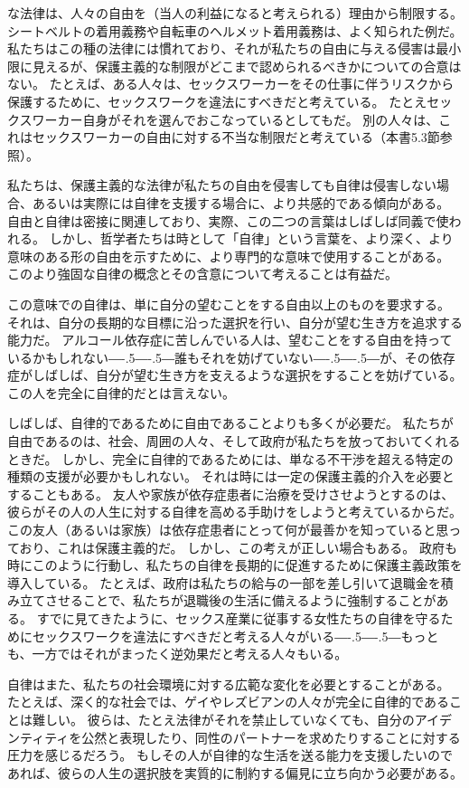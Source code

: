 \documentclass[paper=a4,book,openany]{jlreq}
\def\DDASH{―\kern-.5\zw―\kern-.5\zw―}
\begin{document}
な法律は、人々の自由を（当人の利益になると考えられる）理由から制限する。
シートベルトの着用義務や自転車のヘルメット着用義務は、よく知られた例だ。
私たちはこの種の法律には慣れており、それが私たちの自由に与える侵害は最小限に見えるが、保護主義的な制限がどこまで認められるべきかについての合意はない。
たとえば、ある人々は、セックスワーカーをその仕事に伴うリスクから保護するために、セックスワークを違法にすべきだと考えている。
たとえセックスワーカー自身がそれを選んでおこなっているとしてもだ。
別の人々は、これはセックスワーカーの自由に対する不当な制限だと考えている（本書5.3節参照）。

私たちは、保護主義的な法律が私たちの自由を侵害しても自律は侵害しない場合、あるいは実際には自律を支援する場合に、より共感的である傾向がある。
自由と自律は密接に関連しており、実際、この二つの言葉はしばしば同義で使われる。
しかし、哲学者たちは時として「自律」という言葉を、より深く、より意味のある形の自由を示すために、より専門的な意味で使用することがある。
このより強固な自律の概念とその含意について考えることは有益だ。

この意味での自律は、単に自分の望むことをする自由以上のものを要求する。
それは、自分の長期的な目標に沿った選択を行い、自分が望む生き方を追求する能力だ。
アルコール依存症に苦しんでいる人は、望むことをする自由を持っているかもしれない{\DDASH}誰もそれを妨げていない{\DDASH}が、その依存症がしばしば、自分が望む生き方を支えるような選択をすることを妨げている。
この人を完全に自律的だとは言えない。

しばしば、自律的であるために自由であることよりも多くが必要だ。
私たちが自由であるのは、社会、周囲の人々、そして政府が私たちを放っておいてくれるときだ。
しかし、完全に自律的であるためには、単なる不干渉を超える特定の種類の支援が必要かもしれない。
それは時には一定の保護主義的介入を必要とすることもある。
友人や家族が依存症患者に治療を受けさせようとするのは、彼らがその人の人生に対する自律を高める手助けをしようと考えているからだ。
この友人（あるいは家族）は依存症患者にとって何が最善かを知っていると思っており、これは保護主義的だ。
しかし、この考えが正しい場合もある。
政府も時にこのように行動し、私たちの自律を長期的に促進するために保護主義政策を導入している。
たとえば、政府は私たちの給与の一部を差し引いて退職金を積み立てさせることで、私たちが退職後の生活に備えるように強制することがある。
すでに見てきたように、セックス産業に従事する女性たちの自律を守るためにセックスワークを違法にすべきだと考える人々がいる{\DDASH}もっとも、一方ではそれがまったく逆効果だと考える人々もいる。

自律はまた、私たちの社会環境に対する広範な変化を必要とすることがある。
たとえば、深く的な社会では、ゲイやレズビアンの人々が完全に自律的であることは難しい。
彼らは、たとえ法律がそれを禁止していなくても、自分のアイデンティティを公然と表現したり、同性のパートナーを求めたりすることに対する圧力を感じるだろう。
もしその人が自律的な生活を送る能力を支援したいのであれば、彼らの人生の選択肢を実質的に制約する偏見に立ち向かう必要がある。
\end{document}

